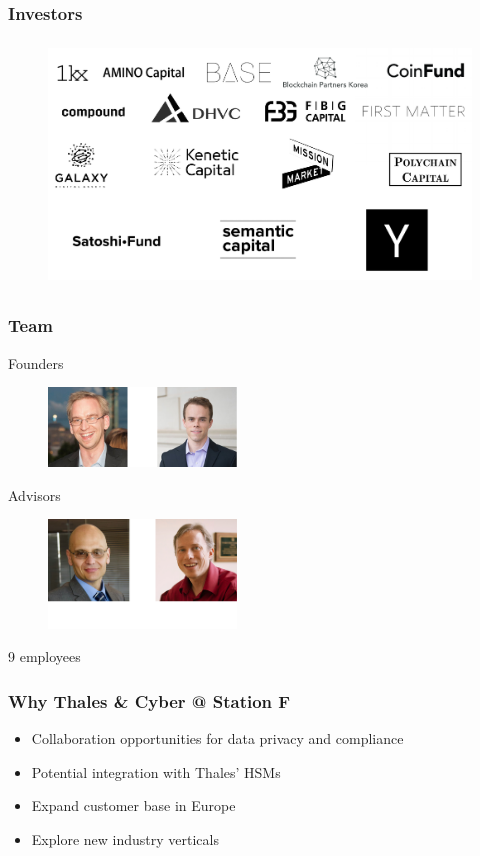 \documentclass[xetex,mathsans,sans]{beamer}
\begin{document}
    \begin{frame}
      \frametitle{Investors}
        \begin{figure}
            \centering
            \includegraphics[height=6.5cm]{pdf/investors.pdf}
        \end{figure}
    \end{frame}

    \begin{frame}
      \frametitle{Team}
        Founders
        \begin{figure}
            \centering
            \includegraphics[width=5cm]{pdf/founders.pdf}
        \end{figure}

        Advisors
        \begin{figure}
            \centering
            \includegraphics[width=5cm]{pdf/advisors.pdf}
        \end{figure}

        9 employees
    \end{frame}

    \begin{frame}
      \frametitle{Why Thales \& Cyber @ Station F}
      \begin{itemize}
          \item Collaboration opportunities for data privacy and compliance
          \item Potential integration with Thales' HSMs
          \item Expand customer base in Europe
          \item Explore new industry verticals
      \end{itemize}
    \end{frame}
\end{document}
